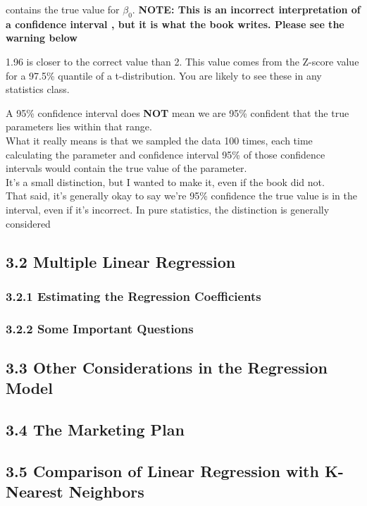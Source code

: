         contains the true value for \(\beta_0\). 
        \textbf{NOTE: This is an incorrect interpretation of a confidence interval , but it is what the    book writes. Please see the warning below}
        
        \begin{note}
            1.96 is closer to the correct value than 2. This value comes from the Z-score value for a 97.5\% quantile of a t-distribution. You
            are likely to see these in any statistics class.
        \end{note}
        
        \begin{warning}
            A 95\% confidence interval does \textbf{NOT} mean we are 95\% confident that the true parameters lies within that range.\\
            What it really means is that we sampled the data 100 times, each time calculating the parameter and confidence interval 95\% of those
            confidence intervals would contain the true value of the parameter.\\
            It's a small distinction, but I wanted to make it, even if the book did not.\\
            That said, it's generally okay to say we're 95\% confidence the true value is in the interval, even if it's incorrect. In pure statistics,
            the distinction is generally considered 
        \end{warning}
        
        \subsection*{3.2 Multiple Linear  Regression}\label{multiple-linear-regression}
        
        \subsubsection*{3.2.1 Estimating the Regression Coefficients}\label{estimating-the-regression-coefficients}
        
        \subsubsection*{3.2.2 Some Important Questions}\label{some-important-questions}
        
        \subsection*{3.3 Other Considerations in the Regression Model}\label{other-considerations-in-the-regression-model}
        
        \subsection*{3.4 The Marketing Plan}\label{the-marketing-plan}
        
        \subsection*{3.5 Comparison of Linear Regression with K-Nearest Neighbors}\label{comparison-of-linear-regression-with-k-nearest-neighbors}
        
    
